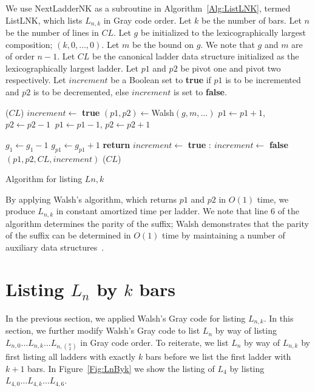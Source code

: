 We use {\sc NextLadderNK} as a subroutine in Algorithm~\ref{Alg:ListLNK}, termed {\sc ListLNK}, which lists $L_{n,k}$ 
in Gray code order. Let $k$ be 
the number of bars. Let $n$ be the number of lines in $CL$. 
Let $g$ be initialized to the lexicographically largest composition; $(k,0, \dots, 0)$. Let $m$ be the bound on $g$. 
We note that $g$ and $m$ are of order $n-1$.
Let $CL$ be the canonical ladder data structure initialized as the lexicographically largest ladder. 
Let $p1$ and $p2$ be pivot one and pivot two respectively. 
Let $increment$ be a Boolean set to \textbf{true} if $p1$ is to be incremented and $p2$ is to be decremented, 
else $increment$ is set to \textbf{false}. 
\begin{algorithm}
  \begin{algorithmic}[1]
      ($CL$)
      \State $increment \gets$ \textbf{true}
        \State $(p1,p2) \gets ${\sc Walsh}$(g,m, \dots)$
         $p1 \gets p1+1$, $p2 \gets p2-1$
        \Else $\: p1 \gets p1-1$, $p2 \gets p2+1$
        \EndIf

          \State $g_{1} \gets g_{1}-1$
          \State $g_{p1} \gets g_{p1}+1$
          \State \textbf{return}
        \EndIf
         $increment \gets $ \textbf{true}
        \Else $:\ increment \gets $ \textbf{false}
        \EndIf
        $(p1, p2, CL, increment)$
        ($CL$)
      \EndWhile
    \EndFunction
  \end{algorithmic}
  \caption{Algorithm for listing $L{n,k}$}
  \label{Alg:ListLNK}
\end{algorithm} 

By applying Walsh's algorithm, which returns $p1$ and $p2$ in $O(1)$ time, we produce $L_{n,k}$ in constant amortized time per ladder. 
We note that line $6$ of the algorithm determines the parity of the suffix; Walsh demonstrates that the parity 
of the suffix can be determined in $O(1)$ time by maintaining a number of auxiliary data structures~\cite{A41}.  


\section{Listing $L_{n}$ by $k$ bars}
In the previous section, we applied Walsh's Gray code for listing $L_{n,k}$. In this section, we further modify Walsh's Gray code 
to list $L_{n}$ by way of listing $L_{n,0} \dots L_{n,k} \dots L_{n, {n \choose 2}}$ in Gray code order. 
To reiterate, we list $L_{n}$ by way of $L_{n,k}$ by first listing all ladders with exactly $k$ bars before we list the first ladder with $k+1$ bars. In Figure~\ref{Fig:LnByk} we show the 
listing of $L_{4}$ by listing $L_{4,0} \dots L_{4, k} \dots L_{4, 6}$.\par 


